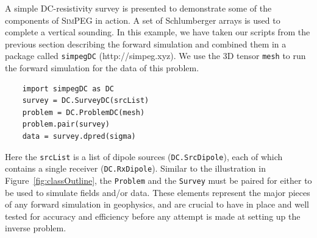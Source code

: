 \documentclass[preprint,review,3p,times,onecolumn,authoryear]{elsarticle}
\newcommand{\SimPEG}{\textsc{SimPEG}\xspace}
\newcommand{\Survey}{\texttt{Survey}\xspace}
\newcommand{\Problem}{\texttt{Problem}\xspace}
\begin{document}
A simple DC-resistivity survey is presented to demonstrate some of the components of \SimPEG in action.
A set of Schlumberger arrays is used to complete a vertical sounding.
In this example, we have taken our scripts from the previous section describing the forward simulation
and combined them in a package called \texttt{simpegDC} (http://simpeg.xyz).
We use the 3D tensor \texttt{mesh} to run the forward simulation for the data of this problem.
{%
{\scriptsize\begin{verbatim}
    import simpegDC as DC
    survey = DC.SurveyDC(srcList)
    problem = DC.ProblemDC(mesh)
    problem.pair(survey)
    data = survey.dpred(sigma)
\end{verbatim}}
}
\noindent
Here the \texttt{srcList} is a list of dipole sources (\texttt{DC.SrcDipole}),
each of which contains a single receiver (\texttt{DC.RxDipole}). %
Similar to the illustration in Figure~\ref{fig:classOutline}, the \Problem and the \Survey must be paired for either
to be used to simulate fields and/or data.
These elements represent the major pieces of any forward simulation in geophysics,
and are crucial to have in place and well tested for accuracy and efficiency before any attempt is made at setting up the inverse problem.




\end{document}
